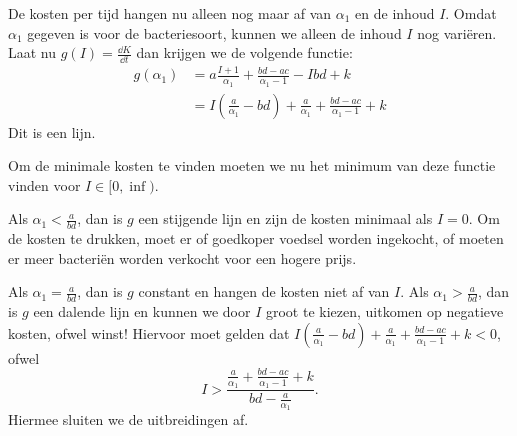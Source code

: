 De kosten per tijd hangen nu alleen nog maar af van $\alpha_1$ en de inhoud $I$. Omdat $\alpha_1$ gegeven is voor de bacteriesoort, kunnen we alleen de inhoud $I$ nog vari\"eren. Laat nu $g(I) = \frac{\dd K}{\dd t}$ dan krijgen we de volgende functie:
\begin{align*}
g(\alpha_1)
&=a\frac{I+1}{\alpha_1} + \frac{bd-ac}{\alpha_1-1} - Ibd + k\\
&=I \left( \frac{a}{\alpha_1}-bd\right) + \frac{a}{\alpha_1} + \frac{bd-ac}{\alpha_1-1} + k
\end{align*}
Dit is een lijn.

Om de minimale kosten te vinden moeten we nu het minimum van deze functie vinden voor $I\in[0,\inf)$.

Als $\alpha_1<\frac{a}{bd}$, dan is $g$ een stijgende lijn en zijn de kosten minimaal als $I = 0$. Om de kosten te drukken, moet er of goedkoper voedsel worden ingekocht, of moeten er meer bacteri\"en worden verkocht voor een hogere prijs.

Als $\alpha_1=\frac{a}{bd}$, dan is $g$ constant en hangen de kosten niet af van $I$. Als $\alpha_1>\frac{a}{bd}$, dan is $g$ een dalende lijn en kunnen we door $I$ groot te kiezen, uitkomen op negatieve kosten, ofwel winst! Hiervoor moet gelden dat $I\left(\frac{a}{\alpha_1}-bd\right) + \frac{a}{\alpha_1} + \frac{bd-ac}{\alpha_1-1} + k < 0$, ofwel 
\[
	I > \frac{\frac{a}{\alpha_1} + \frac{bd-ac}{\alpha_1-1} + k}{bd-\frac{a}{\alpha_1}}.
\]
Hiermee sluiten we de uitbreidingen af.







